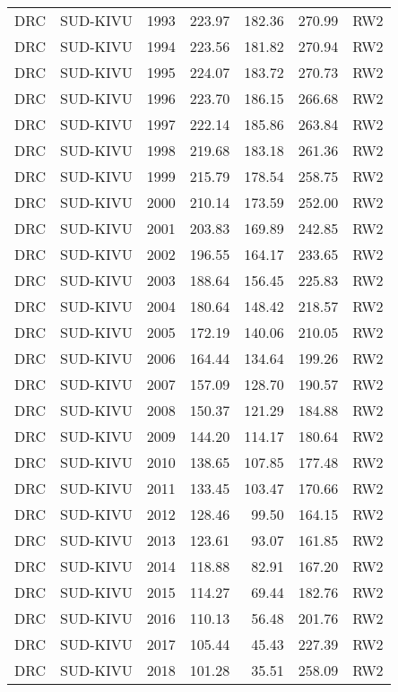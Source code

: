 \begin{longtable}{lllrrrl}
  DRC & SUD-KIVU & 1993 & 223.97 & 182.36 & 270.99 & RW2 \\ 
  DRC & SUD-KIVU & 1994 & 223.56 & 181.82 & 270.94 & RW2 \\ 
  DRC & SUD-KIVU & 1995 & 224.07 & 183.72 & 270.73 & RW2 \\ 
  DRC & SUD-KIVU & 1996 & 223.70 & 186.15 & 266.68 & RW2 \\ 
  DRC & SUD-KIVU & 1997 & 222.14 & 185.86 & 263.84 & RW2 \\ 
  DRC & SUD-KIVU & 1998 & 219.68 & 183.18 & 261.36 & RW2 \\ 
  DRC & SUD-KIVU & 1999 & 215.79 & 178.54 & 258.75 & RW2 \\ 
  DRC & SUD-KIVU & 2000 & 210.14 & 173.59 & 252.00 & RW2 \\ 
  DRC & SUD-KIVU & 2001 & 203.83 & 169.89 & 242.85 & RW2 \\ 
  DRC & SUD-KIVU & 2002 & 196.55 & 164.17 & 233.65 & RW2 \\ 
  DRC & SUD-KIVU & 2003 & 188.64 & 156.45 & 225.83 & RW2 \\ 
  DRC & SUD-KIVU & 2004 & 180.64 & 148.42 & 218.57 & RW2 \\ 
  DRC & SUD-KIVU & 2005 & 172.19 & 140.06 & 210.05 & RW2 \\ 
  DRC & SUD-KIVU & 2006 & 164.44 & 134.64 & 199.26 & RW2 \\ 
  DRC & SUD-KIVU & 2007 & 157.09 & 128.70 & 190.57 & RW2 \\ 
  DRC & SUD-KIVU & 2008 & 150.37 & 121.29 & 184.88 & RW2 \\ 
  DRC & SUD-KIVU & 2009 & 144.20 & 114.17 & 180.64 & RW2 \\ 
  DRC & SUD-KIVU & 2010 & 138.65 & 107.85 & 177.48 & RW2 \\ 
  DRC & SUD-KIVU & 2011 & 133.45 & 103.47 & 170.66 & RW2 \\ 
  DRC & SUD-KIVU & 2012 & 128.46 & 99.50 & 164.15 & RW2 \\ 
  DRC & SUD-KIVU & 2013 & 123.61 & 93.07 & 161.85 & RW2 \\ 
  DRC & SUD-KIVU & 2014 & 118.88 & 82.91 & 167.20 & RW2 \\ 
  DRC & SUD-KIVU & 2015 & 114.27 & 69.44 & 182.76 & RW2 \\ 
  DRC & SUD-KIVU & 2016 & 110.13 & 56.48 & 201.76 & RW2 \\ 
  DRC & SUD-KIVU & 2017 & 105.44 & 45.43 & 227.39 & RW2 \\ 
  DRC & SUD-KIVU & 2018 & 101.28 & 35.51 & 258.09 & RW2 \\ 

\end{longtable}
